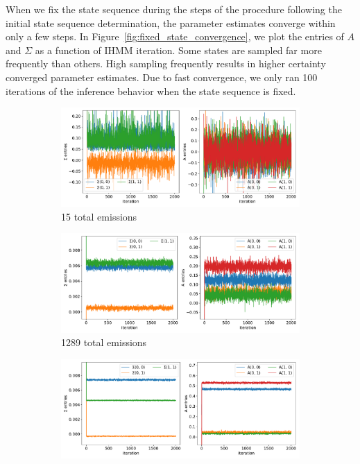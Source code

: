 \documentclass{article}
\begin{document}
  When we fix the state sequence during the steps of the procedure following the 
  initial state sequence determination, the parameter estimates converge within 
  only a few steps. In Figure~\ref{fig:fixed_state_convergence}, we plot the 
  entries of $A$ and $\Sigma$ as a function of IHMM iteration. Some states are 
  sampled far more frequently than others. High sampling frequently results in 
  higher certainty converged parameter estimates. Due to fast convergence, we 
  only ran 100 iterations of the inference behavior when the state sequence is fixed.
  
  \begin{figure}[h]
  \centering
  \begin{subfigure}{0.6\textwidth}
  \includegraphics[width=\textwidth]{convergence_MET_4.pdf}
  \caption{15 total emissions}\label{fig:convergence_MET_low}
  \end{subfigure}
  \begin{subfigure}{0.6\textwidth}
  \includegraphics[width=\textwidth]{convergence_MET_21.pdf}
  \caption{1289 total emissions}\label{fig:convergence_MET_medium}
  \end{subfigure}
  \begin{subfigure}{0.6\textwidth}
  \includegraphics[width=\textwidth]{convergence_MET_15.pdf}

\end{subfigure}
\end{figure}
\end{document}

